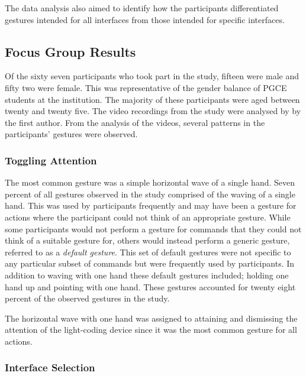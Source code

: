\documentclass[link]{IWCOMP}
\begin{document}
The data analysis also aimed to identify how the participants differentiated gestures intended for all interfaces from those intended for specific interfaces.

\subsection{Focus Group Results}
\label{subsec:focusGroupResults}


Of the sixty seven participants who took part in the study, fifteen were male and fifty two were female.
This was representative of the gender balance of \ac{PGCE} students at the institution.
The majority of these participants were aged between twenty and twenty five.
The video recordings from the study were analysed by by the first author.
From the analysis of the videos, several patterns in the participants' gestures were observed.

\subsubsection{Toggling Attention}
\label{subsubsec:focusGroupResultsTogglingAttention}

The most common gesture was a simple horizontal wave of a single hand.
Seven percent of all gestures observed in the study comprised of the waving of a single hand.
This was used by participants frequently and may have been a gesture for actions where the participant could not think of an appropriate gesture. 
While some participants would not perform a gesture for commands that they could not think of a suitable gesture for, others would instead perform a generic gesture, referred to as a \textit{default gesture}.
This set of default gestures were not specific to any particular subset of commands but were frequently used by participants.
In addition to waving with one hand these default gestures included; holding one hand up and pointing with one hand.
These gestures accounted for twenty eight percent of the observed gestures in the study.

The horizontal wave with one hand was assigned to attaining and dismissing the attention of the light-coding device since it was the most common gesture for all actions.

\subsubsection{Interface Selection}
\label{subsubsec:focusGroupResultsInterfaceSelection}
\end{document}
